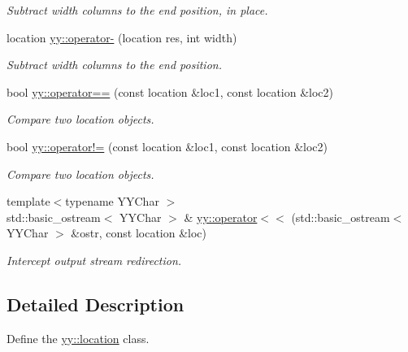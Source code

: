 \begin{DoxyCompactItemize}
\begin{DoxyCompactList}\small\item\em Subtract {\itshape width} columns to the end position, in place. \end{DoxyCompactList}\item 
location \hyperlink{location_8hh_a9b8304a3c3584980893db5d974c08d01}{yy\+::operator-\/} (location res, int width)\hypertarget{location_8hh_a9b8304a3c3584980893db5d974c08d01}{}\label{location_8hh_a9b8304a3c3584980893db5d974c08d01}

\begin{DoxyCompactList}\small\item\em Subtract {\itshape width} columns to the end position. \end{DoxyCompactList}\item 
bool \hyperlink{location_8hh_a466b6e3dcf6a743bb058bf4989b38047}{yy\+::operator==} (const location \&loc1, const location \&loc2)\hypertarget{location_8hh_a466b6e3dcf6a743bb058bf4989b38047}{}\label{location_8hh_a466b6e3dcf6a743bb058bf4989b38047}

\begin{DoxyCompactList}\small\item\em Compare two location objects. \end{DoxyCompactList}\item 
bool \hyperlink{location_8hh_aa3a5c205bc084696bb894634ae9cce80}{yy\+::operator!=} (const location \&loc1, const location \&loc2)\hypertarget{location_8hh_aa3a5c205bc084696bb894634ae9cce80}{}\label{location_8hh_aa3a5c205bc084696bb894634ae9cce80}

\begin{DoxyCompactList}\small\item\em Compare two location objects. \end{DoxyCompactList}\item 
{\footnotesize template$<$typename Y\+Y\+Char $>$ }\\std\+::basic\+\_\+ostream$<$ Y\+Y\+Char $>$ \& \hyperlink{location_8hh_a0406f2358d6ba6b06648ff66f3508aad}{yy\+::operator$<$$<$} (std\+::basic\+\_\+ostream$<$ Y\+Y\+Char $>$ \&ostr, const location \&loc)
\begin{DoxyCompactList}\small\item\em Intercept output stream redirection. \end{DoxyCompactList}\end{DoxyCompactItemize}


\subsection{Detailed Description}
Define the \hyperlink{classyy_1_1location}{yy\+::location} class. 

